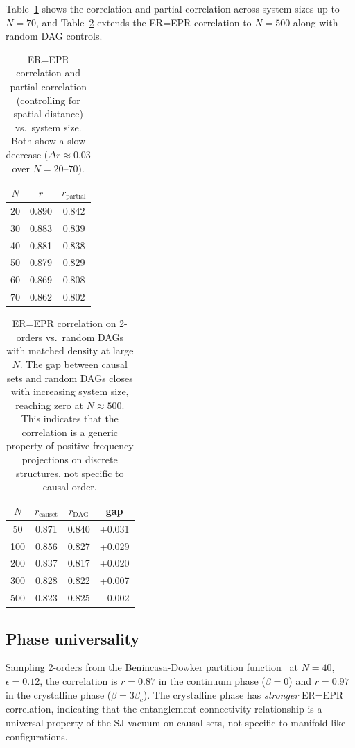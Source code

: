 \documentclass[aps,prd,twocolumn,superscriptaddress,nofootinbib]{revtex4-2}
\begin{document}
Table~\ref{tab:scaling} shows the correlation and partial correlation across system sizes up to $N = 70$, and Table~\ref{tab:largeN} extends the ER=EPR correlation to $N = 500$ along with random DAG controls.

\begin{table}[h]
\centering
\begin{tabular}{ccc}
\toprule
$N$ & $r$ & $r_{\text{partial}}$ \\
\midrule
20 & 0.890 & 0.842 \\
30 & 0.883 & 0.839 \\
40 & 0.881 & 0.838 \\
50 & 0.879 & 0.829 \\
60 & 0.869 & 0.808 \\
70 & 0.862 & 0.802 \\
\bottomrule
\end{tabular}
\caption{ER=EPR correlation and partial correlation (controlling for spatial distance) vs.\ system size. Both show a slow decrease ($\Delta r \approx 0.03$ over $N = 20$--$70$).}
\label{tab:scaling}
\end{table}

\begin{table}[h]
\centering
\begin{tabular}{cccc}
\toprule
$N$ & $r_{\text{causet}}$ & $r_{\text{DAG}}$ & gap \\
\midrule
50 & 0.871 & 0.840 & +0.031 \\
100 & 0.856 & 0.827 & +0.029 \\
200 & 0.837 & 0.817 & +0.020 \\
300 & 0.828 & 0.822 & +0.007 \\
500 & 0.823 & 0.825 & $-0.002$ \\
\bottomrule
\end{tabular}
\caption{ER=EPR correlation on 2-orders vs.\ random DAGs with matched density at large $N$. The gap between causal sets and random DAGs closes with increasing system size, reaching zero at $N \approx 500$. This indicates that the correlation is a generic property of positive-frequency projections on discrete structures, not specific to causal order.}
\label{tab:largeN}
\end{table}

\subsection{Phase universality}

Sampling 2-orders from the Benincasa-Dowker partition function~\cite{benincasa2010,surya2012} at $N = 40$, $\epsilon = 0.12$, the correlation is $r = 0.87$ in the continuum phase ($\beta = 0$) and $r = 0.97$ in the crystalline phase ($\beta = 3\beta_c$). The crystalline phase has \emph{stronger} ER=EPR correlation, indicating that the entanglement-connectivity relationship is a universal property of the SJ vacuum on causal sets, not specific to manifold-like configurations.
\end{document}
